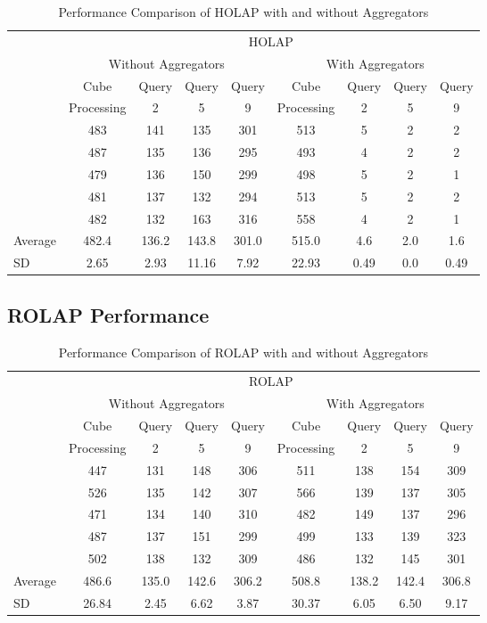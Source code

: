 \documentclass[a4paper,12pt]{article} %
\begin{document}
\begin{table}[H]
\centering
\caption{Performance Comparison of HOLAP with and without Aggregators}
\label{tab:holap_performance}
\begin{tabular}{lcccccccc}
\toprule
& \multicolumn{8}{c}{HOLAP} \\
\cmidrule(lr){2-9}
& \multicolumn{4}{c}{Without Aggregators} & \multicolumn{4}{c}{With Aggregators} \\
\cmidrule(lr){2-9}
& Cube & Query & Query & Query & Cube & Query & Query & Query \\
& Processing & 2 & 5 & 9 & Processing & 2 & 5 & 9 \\
\midrule
& 483 & 141 & 135 & 301 & 513 & 5 & 2 & 2 \\
& 487 & 135 & 136 & 295 & 493 & 4 & 2 & 2 \\
& 479 & 136 & 150 & 299 & 498 & 5 & 2 & 1 \\
& 481 & 137 & 132 & 294 & 513 & 5 & 2 & 2 \\
& 482 & 132 & 163 & 316 & 558 & 4 & 2 & 1 \\
\midrule
Average & 482.4 & 136.2 & 143.8 & 301.0 & 515.0 & 4.6 & 2.0 & 1.6 \\
SD & 2.65 & 2.93 & 11.16 & 7.92 & 22.93 & 0.49 & 0.0 & 0.49 \\
\bottomrule
\end{tabular}
\end{table}

\subsection{ROLAP Performance}

\begin{table}[H]
\centering
\caption{Performance Comparison of ROLAP with and without Aggregators}
\label{tab:rolap_performance}
\begin{tabular}{lcccccccc}
\toprule
& \multicolumn{8}{c}{ROLAP} \\
\cmidrule(lr){2-9}
& \multicolumn{4}{c}{Without Aggregators} & \multicolumn{4}{c}{With Aggregators} \\
\cmidrule(lr){2-9}
& Cube & Query & Query & Query & Cube & Query & Query & Query \\
& Processing & 2 & 5 & 9 & Processing & 2 & 5 & 9 \\
\midrule
& 447 & 131 & 148 & 306 & 511 & 138 & 154 & 309 \\
& 526 & 135 & 142 & 307 & 566 & 139 & 137 & 305 \\
& 471 & 134 & 140 & 310 & 482 & 149 & 137 & 296 \\
& 487 & 137 & 151 & 299 & 499 & 133 & 139 & 323 \\
& 502 & 138 & 132 & 309 & 486 & 132 & 145 & 301 \\
\midrule
Average & 486.6 & 135.0 & 142.6 & 306.2 & 508.8 & 138.2 & 142.4 & 306.8 \\
SD & 26.84 & 2.45 & 6.62 & 3.87 & 30.37 & 6.05 & 6.50 & 9.17 \\
\bottomrule
\end{tabular}
\end{table}
\end{document}
